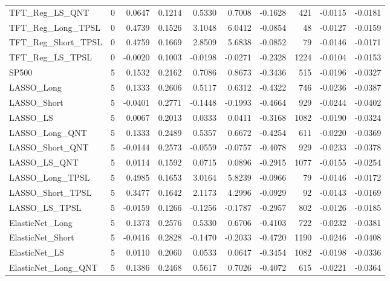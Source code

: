 \begin{tabular}{llrrrrrrrr}
\cline{1-10}
TFT\_Reg\_LS\_QNT & 0 & 0.0647 & 0.1214 & 0.5330 & 0.7008 & -0.1628 & 421 & -0.0115 & -0.0181 \\
\cline{1-10}
TFT\_Reg\_Long\_TPSL & 0 & 0.4739 & 0.1526 & 3.1048 & 6.0412 & -0.0854 & 48 & -0.0127 & -0.0159 \\
\cline{1-10}
TFT\_Reg\_Short\_TPSL & 0 & 0.4759 & 0.1669 & 2.8509 & 5.6838 & -0.0852 & 79 & -0.0146 & -0.0171 \\
\cline{1-10}
TFT\_Reg\_LS\_TPSL & 0 & -0.0020 & 0.1003 & -0.0198 & -0.0271 & -0.2328 & 1224 & -0.0104 & -0.0153 \\
\cline{1-10}
SP500 & 5 & 0.1532 & 0.2162 & 0.7086 & 0.8673 & -0.3436 & 515 & -0.0196 & -0.0327 \\
\cline{1-10}
LASSO\_Long & 5 & 0.1333 & 0.2606 & 0.5117 & 0.6312 & -0.4322 & 746 & -0.0236 & -0.0387 \\
\cline{1-10}
LASSO\_Short & 5 & -0.0401 & 0.2771 & -0.1448 & -0.1993 & -0.4664 & 929 & -0.0244 & -0.0402 \\
\cline{1-10}
LASSO\_LS & 5 & 0.0067 & 0.2013 & 0.0333 & 0.0411 & -0.3168 & 1082 & -0.0190 & -0.0324 \\
\cline{1-10}
LASSO\_Long\_QNT & 5 & 0.1333 & 0.2489 & 0.5357 & 0.6672 & -0.4254 & 611 & -0.0220 & -0.0369 \\
\cline{1-10}
LASSO\_Short\_QNT & 5 & -0.0144 & 0.2573 & -0.0559 & -0.0757 & -0.4078 & 929 & -0.0233 & -0.0378 \\
\cline{1-10}
LASSO\_LS\_QNT & 5 & 0.0114 & 0.1592 & 0.0715 & 0.0896 & -0.2915 & 1077 & -0.0155 & -0.0254 \\
\cline{1-10}
LASSO\_Long\_TPSL & 5 & 0.4985 & 0.1653 & 3.0164 & 5.8239 & -0.0966 & 79 & -0.0146 & -0.0172 \\
\cline{1-10}
LASSO\_Short\_TPSL & 5 & 0.3477 & 0.1642 & 2.1173 & 4.2996 & -0.0929 & 92 & -0.0143 & -0.0169 \\
\cline{1-10}
LASSO\_LS\_TPSL & 5 & -0.0159 & 0.1266 & -0.1256 & -0.1787 & -0.2957 & 802 & -0.0126 & -0.0185 \\
\cline{1-10}
ElasticNet\_Long & 5 & 0.1373 & 0.2576 & 0.5330 & 0.6706 & -0.4103 & 722 & -0.0232 & -0.0381 \\
\cline{1-10}
ElasticNet\_Short & 5 & -0.0416 & 0.2828 & -0.1470 & -0.2033 & -0.4720 & 1190 & -0.0246 & -0.0408 \\
\cline{1-10}
ElasticNet\_LS & 5 & 0.0110 & 0.2060 & 0.0533 & 0.0647 & -0.3454 & 1082 & -0.0198 & -0.0336 \\
\cline{1-10}
ElasticNet\_Long\_QNT & 5 & 0.1386 & 0.2468 & 0.5617 & 0.7026 & -0.4072 & 615 & -0.0221 & -0.0364 \\

\end{tabular}
